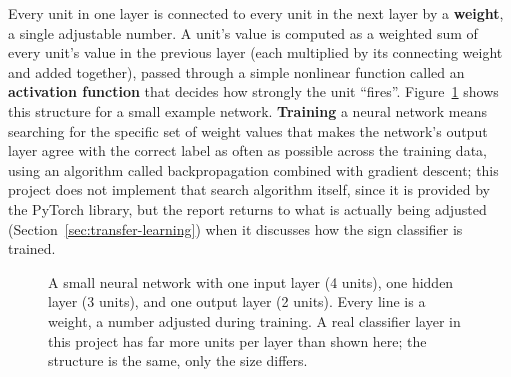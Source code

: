 \documentclass[11pt,a4paper]{report}
\begin{document}
Every unit in one layer is connected to every unit in the next layer by a
\textbf{weight}, a single adjustable number. A unit's value is computed as a
weighted sum of every unit's value in the previous layer (each multiplied by
its connecting weight and added together), passed through a simple nonlinear
function called an \textbf{activation function} that decides how strongly
the unit ``fires''. Figure~\ref{fig:neural-network} shows this structure for
a small example network. \textbf{Training} a neural network means searching
for the specific set of weight values that makes the network's output layer
agree with the correct label as often as possible across the training data,
using an algorithm called backpropagation combined with gradient descent;
this project does not implement that search algorithm itself, since it is
provided by the PyTorch library, but the report returns to what is actually
being adjusted (Section~\ref{sec:transfer-learning}) when it discusses how
the sign classifier is trained.

\begin{figure}[t]
\centering
{}
\caption{A small neural network with one input layer (4 units), one hidden
layer (3 units), and one output layer (2 units). Every line is a weight, a
number adjusted during training. A real classifier layer in this project has
far more units per layer than shown here; the structure is the same, only
the size differs.}
\label{fig:neural-network}
\end{figure}
\end{document}
